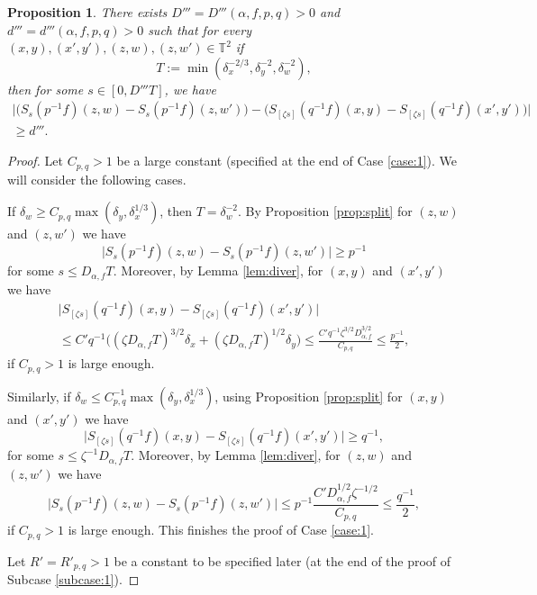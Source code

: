\documentclass[10pt]{amsart}
\newcounter{case}
\newcounter{subcase}
\theoremstyle{definition}
\theoremstyle{plain}
\newtheorem{proposition}[definition]{Proposition}
\newcommand\TT{\mathbb{T}}
\begin{document}
\begin{proposition}\label{prop:cruc} There exists $D'''\!=\!D'''(\alpha,f,p,q)>0$ and \hbox{$d'''\!=\!d'''(\alpha,f,p,q)>0$} such that for every $(x,y),(x',y'),(z,w),(z,w')\in \TT^2$ if
\[
T:=\min(\delta_{x}^{-2/3},\delta_{y}^{-2},\delta_{w}^{-2}),
\]
then for some $s\in [0,D'''T]$, we have
\begin{multline}\label{eq:nwc}
\bigl|\bigl(S_s(p^{-1}f)(z,w)\!-\!S_s(p^{-1}f)(z,w')\bigr)\!-\!
\bigl(S_{[\zeta s]}(q^{-1}f)(x,y)\!-\!S_{[\zeta s]}(q^{-1}f)(x',y')\bigr)\bigr|\\
\geq
d'''.
\end{multline}
\end{proposition}
\begin{proof} Let $C_{p,q}>1$ be a large constant (specified at the end of Case \ref{case:1}).
We will consider the following cases.

\label{case:1}

If $\delta_w\geq C_{p,q}\max(\delta_y,\delta_x^{1/3})$, then $T=\delta_w^{-2}$. By Proposition \ref{prop:split} for $(z,w)$ and $(z,w')$ we have
\[
\bigl|S_s(p^{-1}f)(z,w)-S_s(p^{-1}f)(z,w')\bigr|\geq p^{-1}
\]
for some $s\leq D_{\alpha,f}T$. Moreover, by Lemma \ref{lem:diver}, for $(x,y)$ and $(x',y')$ we have
\begin{multline*}
\bigl|S_{[\zeta s]}(q^{-1}f)(x,y)-S_{[\zeta s]}(q^{-1}f)(x',y')\bigr| \\[-5pt] \leq C'q^{-1}\bigl((\zeta D_{\alpha,f}T)^{3/2}\delta_x+(\zeta D_{\alpha,f}T)^{1/2}\delta_y\bigr)\leq
\frac{C'q^{-1}\zeta^{3/2}D_{\alpha,f}^{3/2}}{C_{p,q}}\leq \frac{p^{-1}}{2},
\end{multline*}
if $C_{p,q}>1$ is large enough.

Similarly, if $\delta_w\leq C_{p,q}^{-1}\max(\delta_y,\delta_x^{1/3})$, using Proposition \ref{prop:split} for $(x,y)$ and $(x',y')$ we have
\[
\bigl|S_{[\zeta s]}(q^{-1}f)(x,y)-S_{[\zeta s]}(q^{-1}f)(x',y')\bigr|\geq q^{-1},
\]
for some $s\leq \zeta^{-1}D_{\alpha,f}T$. Moreover, by Lemma \ref{lem:diver}, for $(z,w)$ and $(z,w')$ we have
\[
\bigl|S_s(p^{-1}f)(z,w)-S_s(p^{-1}f)(z,w')\bigr|\leq p^{-1}\frac{C' D_{\alpha,f}^{1/2}\zeta^{-1/2}}{C_{p,q}}\leq \frac{q^{-1}}{2},
\]
if $C_{p,q}>1$ is large enough.
This finishes the proof of Case \ref{case:1}.

\label{case:2}
Let $R'=R'_{p,q}>1$ be a constant to be specified later (at the end of the proof of Subcase \ref{subcase:1}).


\end{proof}
\end{document}
